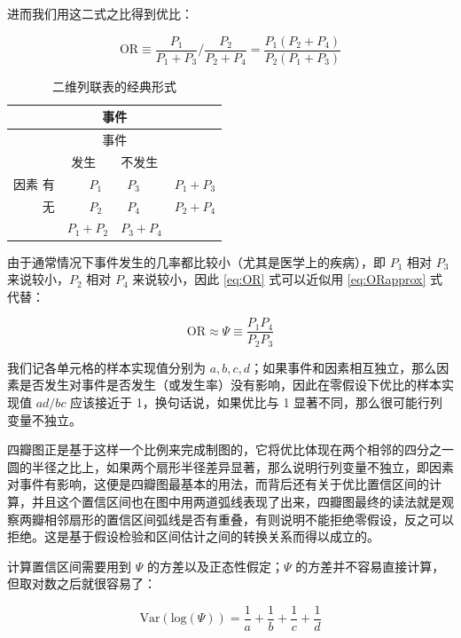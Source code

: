 \documentclass[
  b5paper,
  UTF8,twoside]{book}
\begin{document}
进而我们用这二式之比得到优比：

\begin{equation} 
\mathrm{OR}\equiv\frac{P_{1}}{P_{1}+P_{3}}/\frac{P_{2}}{P_{2}+P_{4}}=\frac{P_{1}(P_{2}+P_{4})}{P_{2}(P_{1}+P_{3})}
\label{eq:OR}
\end{equation}

\begin{longtable}[]{@{}rcl@{}}
\caption{\label{tab:contingency} 二维列联表的经典形式}\tabularnewline
\toprule()
& 事件 & \\
\midrule()
\endfirsthead
\toprule()
& 事件 & \\
\midrule()
\endhead
& 发生　　不发生 & \\
因素 有 & \(P_{1}\)　　\(P_{3}\) & \(P_{1}+P_{3}\) \\
无 & \(P_{2}\)　　\(P_{4}\) & \(P_{2}+P_{4}\) \\
& \(P_{1}+P_{2}\)　\(P_{3}+P_{4}\) & \\
\bottomrule()
\end{longtable}

由于通常情况下事件发生的几率都比较小（尤其是医学上的疾病），即 \(P_{1}\) 相对 \(P_{3}\) 来说较小，\(P_{2}\) 相对 \(P_{4}\) 来说较小，因此 \eqref{eq:OR} 式可以近似用 \eqref{eq:ORapprox} 式代替：

\begin{equation} 
\mathrm{OR}\approx\Psi\equiv\frac{P_{1}P_{4}}{P_{2}P_{3}}
\label{eq:ORapprox}
\end{equation}

我们记各单元格的样本实现值分别为 \(a,b,c,d\)；如果事件和因素相互独立，那么因素是否发生对事件是否发生（或发生率）没有影响，因此在零假设下优比的样本实现值 \(ad/bc\) 应该接近于 1，换句话说，如果优比与 1 显著不同，那么很可能行列变量不独立。

四瓣图正是基于这样一个比例来完成制图的，它将优比体现在两个相邻的四分之一圆的半径之比上，如果两个扇形半径差异显著，那么说明行列变量不独立，即因素对事件有影响，这便是四瓣图最基本的用法，而背后还有关于优比置信区间的计算，并且这个置信区间也在图中用两道弧线表现了出来，四瓣图最终的读法就是观察两瓣相邻扇形的置信区间弧线是否有重叠，有则说明不能拒绝零假设，反之可以拒绝。这是基于假设检验和区间估计之间的转换关系而得以成立的。

计算置信区间需要用到 \(\Psi\) 的方差以及正态性假定；\(\Psi\) 的方差并不容易直接计算，但取对数之后就很容易了：

\begin{equation}
\mathrm{Var}(\mathrm{log}(\Psi))=\frac{1}{a}+\frac{1}{b}+\frac{1}{c}+\frac{1}{d}
\label{eq:ORlog}
\end{equation}
\end{document}
